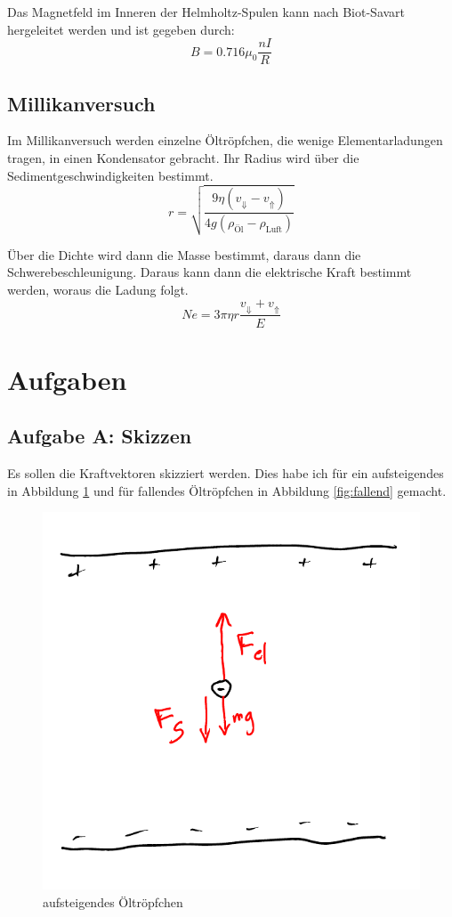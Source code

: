 \documentclass[11pt]{article}
\begin{document}
Das Magnetfeld im Inneren der Helmholtz-Spulen kann nach Biot-Savart
hergeleitet werden und ist gegeben durch:
\begin{equation}
	\label{eq:Helmholtz}
	B = 0.716 \mu_0 \frac{nI}R
\end{equation}

\subsection{Millikanversuch}

Im Millikanversuch werden einzelne Öltröpfchen, die wenige Elementarladungen
tragen, in einen Kondensator gebracht. Ihr Radius wird über die
Sedimentgeschwindigkeiten bestimmt.
%
\begin{equation}
	\label{eq:249.8}
	r = \sqrt{\frac{9 \eta \left( v_\Downarrow - v_\Uparrow \right)}{4 g (\rho_\text{Öl} - \rho_\text{Luft})}}
\end{equation}

Über die Dichte wird dann die Masse bestimmt, daraus dann die
Schwerebeschleunigung. Daraus kann dann die elektrische Kraft bestimmt werden,
woraus die Ladung folgt.
%
\begin{equation}
	\label{eq:249.9}
	N e = 3 \pi \eta r \frac{v_\Downarrow + v_\Uparrow }E
\end{equation}


\section{Aufgaben}

\subsection{Aufgabe A: Skizzen}

Es sollen die Kraftvektoren skizziert werden. Dies habe ich für ein
aufsteigendes in Abbildung \ref{fig:aufsteigend} und für fallendes Öltröpfchen
in Abbildung \ref{fig:fallend} gemacht.

\begin{figure}[h!]
	\centering
	\includegraphics[width=.5\textwidth]{aufsteigend.pdf}
	\caption{aufsteigendes Öltröpfchen}
	\label{fig:aufsteigend}
\end{figure}
\end{document}
